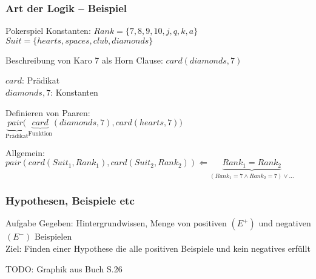 \begin{frame}
	\frametitle{Art der Logik -- Beispiel}

	\begin{block}{Pokerspiel}
	Konstanten: $Rank = \{7,8,9,10,j,q,k,a\}$\\
	            $Suit = \{hearts, spaces, club, diamonds\}$
	
	Beschreibung von Karo 7 als Horn Clause: $card(diamonds, 7)$

	$card$: Prädikat\\
	$diamonds, 7$: Konstanten

	Definieren von Paaren:\\
	$\underbrace{pair(}_{\text{Prädikat}}\underbrace{card}_{\text{Funktion}}(diamonds, 7),
	card(hearts, 7))$

	Allgemein:\\
	$pair(card(Suit_1, Rank_1),card(Suit_2, Rank_2)) \Leftarrow \underbrace{Rank_1 =
	Rank_2}_{(Rank_1=7 \wedge Rank_2=7) \vee \ldots}$

	\end{block}
	
\end{frame}

\begin{frame}
\frametitle{Hypothesen, Beispiele etc}
\begin{block}{Aufgabe}
Gegeben: Hintergrundwissen, Menge von positiven $(E^+)$ und negativen $(E^-)$ Beispielen\\
Ziel: Finden einer Hypothese die alle positiven Beispiele und kein negatives erfüllt

TODO: Graphik aus Buch S.26
\end{block}
\end{frame}
